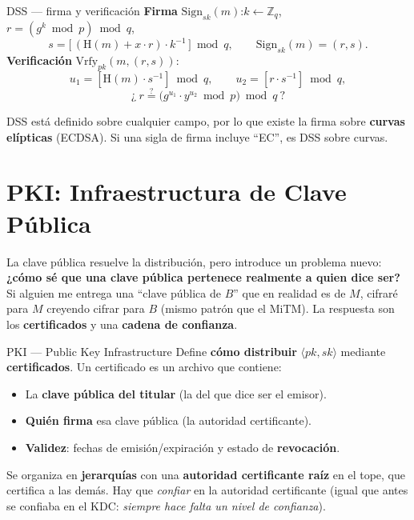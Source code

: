 \documentclass[11pt,a4paper]{article}
\newcommand{\Zn}{\mathbb{Z}}
\newcommand{\Sign}{\mathrm{Sign}}
\newcommand{\Vrfy}{\mathrm{Vrfy}}
\newcommand{\Hf}{\mathrm{H}}
\begin{document}
\begin{defbox}{DSS — firma y verificación}
\textbf{Firma} $\Sign_{sk}(m)$:\quad $k\leftarrow\Zn_q$, \quad $r=(g^{k}\bmod p)\bmod q$,
\[
  s = \bigl[\,(\Hf(m) + x\cdot r)\cdot k^{-1}\,\bigr]\bmod q, \qquad \Sign_{sk}(m)=(r,s).
\]
\textbf{Verificación} $\Vrfy_{pk}(m,(r,s))$:
\[
  u_1 = [\Hf(m)\cdot s^{-1}]\bmod q, \qquad u_2 = [r\cdot s^{-1}]\bmod q,
\]
\[
  \text{¿}\ r \stackrel{?}{=} \bigl(g^{u_1}\cdot y^{u_2}\bmod p\bigr)\bmod q\ \text{?}
\]
\end{defbox}

\noindent DSS está definido sobre cualquier campo, por lo que existe la firma sobre
\textbf{curvas elípticas} (ECDSA). Si una sigla de firma incluye ``EC'', es DSS sobre curvas.

\section{PKI: Infraestructura de Clave Pública}

La clave pública resuelve la distribución, pero introduce un problema nuevo: \textbf{¿cómo sé
que una clave pública pertenece realmente a quien dice ser?} Si alguien me entrega una ``clave
pública de $B$'' que en realidad es de $M$, cifraré para $M$ creyendo cifrar para $B$ (mismo
patrón que el MiTM). La respuesta son los \textbf{certificados} y una \textbf{cadena de
confianza}.

\begin{defbox}{PKI — Public Key Infrastructure}
Define \textbf{cómo distribuir} $\langle pk, sk\rangle$ mediante \textbf{certificados}. Un
certificado es un archivo que contiene:
\begin{itemize}[leftmargin=1.4em,itemsep=1pt]
  \item La \textbf{clave pública del titular} (la del que dice ser el emisor).
  \item \textbf{Quién firma} esa clave pública (la autoridad certificante).
  \item \textbf{Validez}: fechas de emisión/expiración y estado de \textbf{revocación}.
\end{itemize}
Se organiza en \textbf{jerarquías} con una \textbf{autoridad certificante raíz} en el tope, que
certifica a las demás. Hay que \emph{confiar} en la autoridad certificante (igual que antes se
confiaba en el KDC: \emph{siempre hace falta un nivel de confianza}).
\end{defbox}
\end{document}
